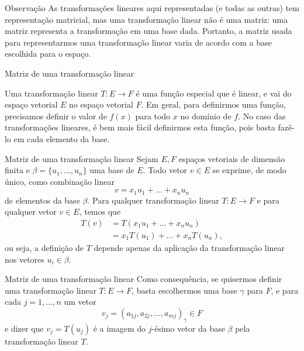 \documentclass{beamer}
\begin{document}
\begin{darkframes}
\begin{frame}{Observação}
  As transformações lineares aqui representadas (e todas as outras) tem representação matricial, mas uma transformação linear não é uma matriz: uma matriz representa a transformação em uma base dada. Portanto, a matriz usada para representarmos uma transformação linear varia de acordo com a base escolhida para o espaço.
\end{frame}

\begin{frame}{Matriz de uma transformação linear}

Uma transformação linear $T:E\rightarrow F$ é uma função especial que é linear, e vai do espaço vetorial $E$ no espaço vetorial $F$. Em geral, para definirmos uma função, precisamos definir o valor de $f(x)$ para todo $x$ no domínio de $f$. No caso das transformações lineares, é bem mais fácil definirmos esta função, pois basta fazê-lo em cada elemento da base.
\end{frame}

\begin{frame}{Matriz de uma transformação linear}
  Sejam $E,F$ espaços vetoriais de dimensão finita e $\beta=\{u_1,\dots,u_n\}$ uma base de $E$. Todo vetor $v\in E$ se exprime, de modo único, como combinação linear
 \begin{equation*}
   v=x_1u_1+\ldots+x_nu_n
 \end{equation*}
 de elementos da base $\beta$. Para qualquer transformação linear $T:E\rightarrow F$ e para qualquer vetor $v\in E$, temos que 
 \begin{align*}
   T(v) &= T(x_1u_1+\ldots+x_nu_n)\\
   &= x_1 T(u_1) + \ldots + x_nT(u_n),
 \end{align*}
 ou seja, a definição de $T$ depende apenas da aplicação da transformação linear nos vetores $u_i\in \beta$. 
\end{frame}

\begin{frame}{Matriz de uma transformação linear}
 Como consequência, se quisermos definir uma transformação linear $T:E \to F$, basta escolhermos uma base $\gamma$ para $F$, e para cada $j=1,\ldots,n$ um vetor 
 \begin{equation*}
   v_j=(a_{1j},a_{2j},\ldots,a_{mj})_{\gamma} \in F
 \end{equation*}
 e dizer que $v_j = T(u_j)$ é a imagem do $j$-ésimo vetor da base $\beta$ pela transformação linear $T$.
\end{frame}


\end{darkframes}
\end{document}

